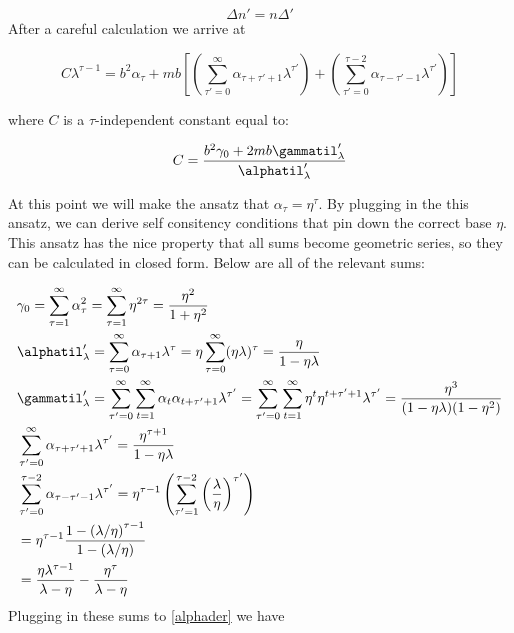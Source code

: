 \documentclass{article}
\begin{document}
\begin{equation}
    \Delta n' = n\Delta'
\end{equation}
After a careful calculation we arrive at

\begin{equation}\label{alphader}
    C \lambda^{\tau-1} = b^2 \alpha_\tau + mb\left[(\sum_{\tau'=0}^\infty \alpha_{\tau+\tau'+1}\lambda^{\tau'}) + (\sum_{\tau'=0}^{\tau-2}\alpha_{\tau-\tau'-1}\lambda^{\tau'}) \right]
\end{equation}

where $C$ is a $\tau$-independent constant equal to:

\begin{equation}
    C = \frac{b^2\gamma_0 + 2mb\gammatil_\lambda'}{\alphatil_\lambda'}
\end{equation}

At this point we will make the ansatz that $\alpha_\tau = \eta^\tau$. By plugging in the this ansatz, we can derive self consitency conditions that pin down the correct base $\eta$. This ansatz has the nice property that all sums become geometric series, so they can be calculated in closed form. Below are all of the relevant sums:

\begin{alignat}{3}
    &\gamma_0 = \sum_{\tau=1}^\infty \alpha_\tau^2 = \sum_{\tau=1}^\infty \eta^{2\tau} = \frac{\eta^2}{1 + \eta^2} \\
    &\alphatil_\lambda' = \sum_{\tau=0}^\infty \alpha_{\tau+1}\lambda^\tau = \eta \sum_{\tau=0}^\infty({\eta\lambda})^\tau = \frac{\eta}{1-\eta\lambda} \\
    &\gammatil_\lambda' = \sum_{\tau'=0}^\infty\sum_{t=1}^\infty \alpha_t \alpha_{t+\tau'+1}\lambda^{\tau'} = \sum_{\tau'=0}^\infty\sum_{t=1}^\infty \eta^t\eta^{t+\tau'+1}\lambda^{\tau'} = \frac{\eta^3}{(1-\eta\lambda)(1-\eta^2)}\\
    &\sum_{\tau'=0}^\infty \alpha_{\tau+\tau'+1}\lambda^{\tau'} = \frac{\eta^{\tau+1}}{1-\eta\lambda}\\
     &\sum_{\tau'=0}^{\tau-2} \alpha_{\tau-\tau'-1}\lambda^{\tau'} 
     = \eta^{\tau-1}\left(\sum_{\tau'=1}^{\tau-2}\left(\frac{\lambda}{\eta}\right)^{\tau'} \right) \\
     &= \eta^{\tau-1}\frac{1 - \left(\lambda / \eta \right)^{\tau-1}}{1 - \left(\lambda / \eta \right)}\\
     &= \frac{\eta\lambda^{\tau-1}}{\lambda - \eta} - \frac{\eta^\tau}{\lambda-\eta}
\end{alignat}
Plugging in these sums to \eqref{alphader} we have 
\end{document}
